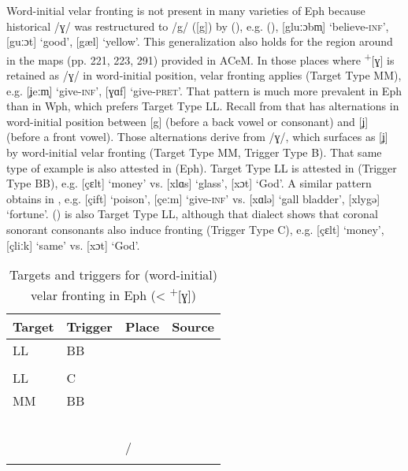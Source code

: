 Word-initial velar fronting is not present in many varieties of Eph because historical /ɣ/ was restructured to /g/ ([g]) by  (), e.g.  (), [gluːɔbm̩] ‘believe-\textsc{inf}’, [guːɔt] ‘good’, [gæl] ‘yellow’. This generalization also holds for the region around  in the maps (pp. 221, 223, 291) provided in ACeM. In those places where  \textsuperscript{+}[ɣ] is retained as /ɣ/ in word-initial position, velar fronting applies (Target Type MM), e.g.  [ʝeːm̩] ‘give\textsc{{}-inf}’, [ɣɑf] ‘give\textsc{{}-pret}’. That pattern is much more prevalent in Eph than in Wph, which prefers Target Type LL. Recall from  that  has alternations in word-initial position between [g] (before a back vowel or consonant) and [ʝ] (before a front vowel). Those alternations derive from /ɣ/, which surfaces as [ʝ] by word-initial velar fronting (Target Type MM, Trigger Type B). That same type of example is also attested in  (Eph). Target Type LL is attested in  (Trigger Type BB), e.g. [çɛlt] ‘money’ vs. [xlɑs] ‘glass’, [xɔt] ‘God’. A similar pattern obtains in , e.g. [çift] ‘poison’, [çeːm] ‘give-\textsc{inf}’ vs. [xɑlə] ‘gall bladder’, [xlygə] ‘fortune’.  () is also Target Type LL, although that dialect shows that coronal sonorant consonants also induce fronting (Trigger Type C), e.g. [çɛlt] ‘money’, [çliːk] ‘same’ vs. [xɔt] ‘God’.\largerpage

\begin{table}
\caption{Targets and triggers for (word-initial) velar fronting in Eph (< \textsuperscript{+}[ɣ])\label{tab:12.18}}
\begin{tabularx}{\textwidth}{llQQ}
\lsptoprule
Target & Trigger & Place & Source\\\midrule
LL & BB &     &  \citet{Dahlberg1937}\\
   &   &   &   \citet{Göschel1973}\\
LL & C &   & \citet{Jungandreas1926,Jungandreas1927}\\
MM & BB &           & \citet{Roloff1902}     \\
   &    &                      & \citet{Block1910}      \\
   &    &                   & \citet{Damköhler1919}  \\
   &    &                         & \citet{Löfstedt1933}   \\
   &    &            & \citet{Hille1939}      \\
   &    &                  & \citet{Pahl1943}       \\
   &    &  /    & \citet{Lange1963}\\
\lspbottomrule
\end{tabularx}
\end{table}

